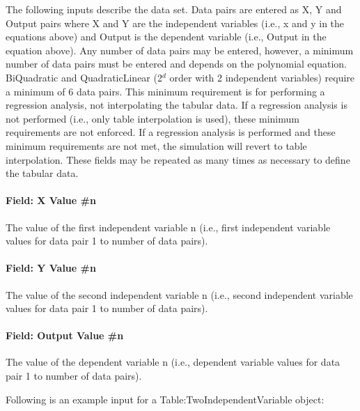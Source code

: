 The following inputs describe the data set. Data pairs are entered as X, Y and Output pairs where X and Y are the independent variables (i.e., x and y in the equations above) and Output is the dependent variable (i.e., Output in the equation above). Any number of data pairs may be entered, however, a minimum number of data pairs must be entered and depends on the polynomial equation. BiQuadratic and QuadraticLinear (2\(^{d}\) order with 2 independent variables) require a minimum of 6 data pairs. This minimum requirement is for performing a regression analysis, not interpolating the tabular data. If a regression analysis is not performed (i.e., only table interpolation is used), these minimum requirements are not enforced. If a regression analysis is performed and these minimum requirements are not met, the simulation will revert to table interpolation. These fields may be repeated as many times as necessary to define the tabular data.

\paragraph{Field: X Value \#n}\label{field-x-value-n-1}

The value of the first independent variable n (i.e., first independent variable values for data pair 1 to number of data pairs).

\paragraph{Field: Y Value \#n}\label{field-y-value-n}

The value of the second independent variable n (i.e., second independent variable values for data pair 1 to number of data pairs).

\paragraph{Field: Output Value \#n}\label{field-output-value-n-1}

The value of the dependent variable n (i.e., dependent variable values for data pair 1 to number of data pairs).

Following is an example input for a Table:TwoIndependentVariable object:

